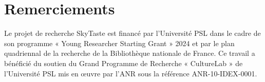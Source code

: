 \documentclass[final, fra]{anthology-ch}     %
\begin{document}
\section*{Remerciements}
Le projet de recherche SkyTaste est financé par l’Université PSL dans le cadre de son programme « Young Researcher Starting Grant » 2024 et par le plan quadriennal de la recherche de la Bibliothèque nationale de France. Ce travail a bénéficié du soutien du Grand Programme de Recherche « CultureLab » de l'Université PSL mis en œuvre par l'ANR sous la référence ANR-10-IDEX-0001. 

\printbibliography
\end{document}
